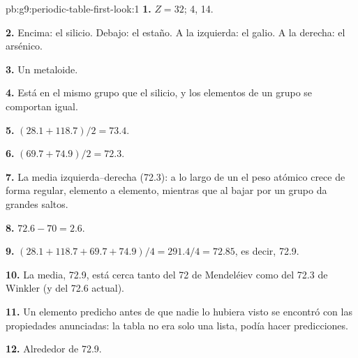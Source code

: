 \begin{solution}{pb:g9:periodic-table-first-look:1}
\textbf{1.} $Z = 32$;  4,  14.

\textbf{2.} Encima: el silicio. Debajo: el estaño. A la izquierda: el
galio. A la derecha: el arsénico.

\textbf{3.} Un metaloide.

\textbf{4.} Está en el mismo grupo que el silicio, y los elementos de un
grupo se comportan igual.

\textbf{5.} $(28.1 + 118.7)/2 = 73.4$.

\textbf{6.} $(69.7 + 74.9)/2 = 72.3$.

\textbf{7.} La media izquierda--derecha (72.3): a lo largo de un 
el peso atómico crece de forma regular, elemento a elemento, mientras
que al bajar por un grupo da grandes saltos.

\textbf{8.} $72.6 - 70 = 2.6$.

\textbf{9.} $(28.1 + 118.7 + 69.7 + 74.9)/4 = 291.4/4 = 72.85$, es
decir, 72.9.

\textbf{10.} La media, 72.9, está cerca tanto del 72 de Mendeléiev como
del 72.3 de Winkler (y del 72.6 actual).

\textbf{11.} Un elemento predicho antes de que nadie lo hubiera visto se
encontró con las propiedades anunciadas: la tabla no era solo una lista,
podía hacer predicciones.

\textbf{12.} Alrededor de 72.9.
\end{solution}
